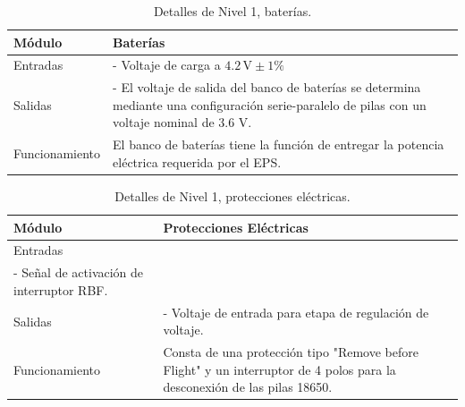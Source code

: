 \begin{table}[!ht]
    \centering
    \caption{Detalles de Nivel 1, baterías.}
    \label{tab:nivel1_baterias}
    \begin{tabular}{ll}
    \toprule
        Módulo  & Baterías\\ 
    \midrule
        Entradas & 
        \begin{minipage}[t]{0.75\linewidth}
 - Voltaje de carga a $4.2 \, \text{V} \pm 1\%$ 
        \end{minipage} \\
    \midrule
        Salidas & 
        \begin{minipage}[t]{0.75\linewidth}
- El voltaje de salida del banco de baterías se determina mediante una configuración serie-paralelo de pilas con un voltaje nominal de 3.6 V.

        \end{minipage} \\
    \midrule
        Funcionamiento & 
        \begin{minipage}[t]{0.75\linewidth}
El banco de baterías tiene la función de entregar la potencia eléctrica requerida por el EPS.

        \end{minipage} \\
    \bottomrule
    \end{tabular}
\end{table}




\begin{table}[h!]
    \centering
    \caption{Detalles de Nivel 1, protecciones eléctricas.}
    \label{tab:nivel1_protecciones}
    \begin{tabular}{ll}
    \toprule
        Módulo  & Protecciones Eléctricas\\ 
    \midrule
        Entradas & 
        \begin{minipage}[t]{0.75\linewidth}
 - Voltaje del banco de baterías.\\ - Señal de activación de interruptor RBF.
 
        \end{minipage} \\
    \midrule
        Salidas & 
        \begin{minipage}[t]{0.75\linewidth}
- Voltaje de entrada para etapa de regulación de voltaje.

        \end{minipage} \\
    \midrule
        Funcionamiento & 
        \begin{minipage}[t]{0.75\linewidth}
Consta de una protección tipo "Remove before Flight" y un interruptor de 4 polos para la desconexión de las pilas 18650.

        \end{minipage} \\
    \bottomrule
    \end{tabular}
\end{table}

